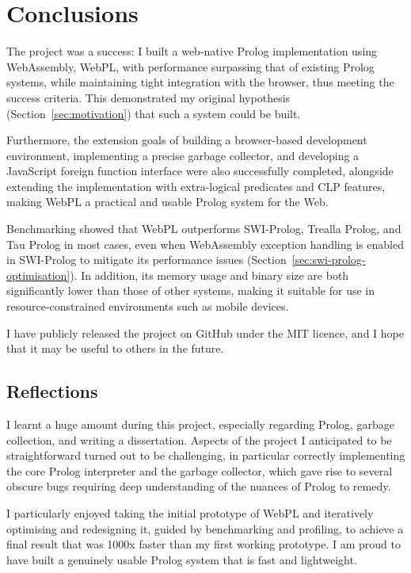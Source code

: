 \chapter{Conclusions}

The project was a success: I built a web-native Prolog implementation using WebAssembly, WebPL, with performance surpassing that of existing Prolog systems, while maintaining tight integration with the browser, thus meeting the success criteria. This demonstrated my original hypothesis (Section~\ref{sec:motivation}) that such a system could be built.

Furthermore, the extension goals of building a browser-based development environment, implementing a precise garbage collector, and developing a JavaScript foreign function interface were also successfully completed, alongside extending the implementation with extra-logical predicates and CLP features, making WebPL a practical and usable Prolog system for the Web.

Benchmarking showed that WebPL outperforms SWI-Prolog, Trealla Prolog, and Tau Prolog in most cases, even when WebAssembly exception handling is enabled in SWI-Prolog to mitigate its performance issues (Section~\ref{sec:swi-prolog-optimisation}). In addition, its memory usage and binary size are both significantly lower than those of other systems, making it suitable for use in resource-constrained environments such as mobile devices.

I have publicly released the project on GitHub under the MIT licence, and I hope that it may be useful to others in the future.

\section{Reflections}

I learnt a huge amount during this project, especially regarding Prolog, garbage collection, and writing a dissertation. Aspects of the project I anticipated to be straightforward turned out to be challenging, in particular correctly implementing the core Prolog interpreter and the garbage collector, which gave rise to several obscure bugs requiring deep understanding of the nuances of Prolog to remedy.

I particularly enjoyed taking the initial prototype of WebPL and iteratively optimising and redesigning it, guided by benchmarking and profiling, to achieve a final result that was 1000x faster than my first working prototype. I am proud to have built a genuinely usable Prolog system that is fast and lightweight.

